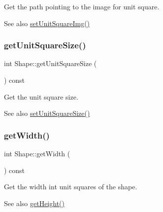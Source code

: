 Get the path pointing to the image for unit square. 

\begin{DoxySeeAlso}{See also}
\mbox{\hyperlink{class_shape_a0d022da031906acd13be90c3fb3db643}{set\+Unit\+Square\+Img()}} 
\end{DoxySeeAlso}
\mbox{\label{class_shape_a85f4b751a60f6df5afdbfb5b530f6bc3}} 
\subsubsection{\texorpdfstring{get\+Unit\+Square\+Size()}{getUnitSquareSize()}}
{\footnotesize\ttfamily int Shape\+::get\+Unit\+Square\+Size (\begin{DoxyParamCaption}{ }\end{DoxyParamCaption}) const\hspace{0.3cm}{\ttfamily [inline]}}



Get the unit square size. 

\begin{DoxySeeAlso}{See also}
\mbox{\hyperlink{class_shape_a7891a1b03a0034b6a9f4c622902a071c}{set\+Unit\+Square\+Size()}} 
\end{DoxySeeAlso}
\mbox{\label{class_shape_a26c64aa551ac8d6d625ee74237157045}} 
\subsubsection{\texorpdfstring{get\+Width()}{getWidth()}}
{\footnotesize\ttfamily int Shape\+::get\+Width (\begin{DoxyParamCaption}{ }\end{DoxyParamCaption}) const\hspace{0.3cm}{\ttfamily [inline]}}



Get the width int unit squares of the shape. 

\begin{DoxySeeAlso}{See also}
\mbox{\hyperlink{class_shape_ad81db3946b35eaeb9dcfbaaacb65c5f8}{get\+Height()}} 
\end{DoxySeeAlso}
\mbox{\label{class_shape_af604de36aa616c585bb30dedf5e5c68b}} 
